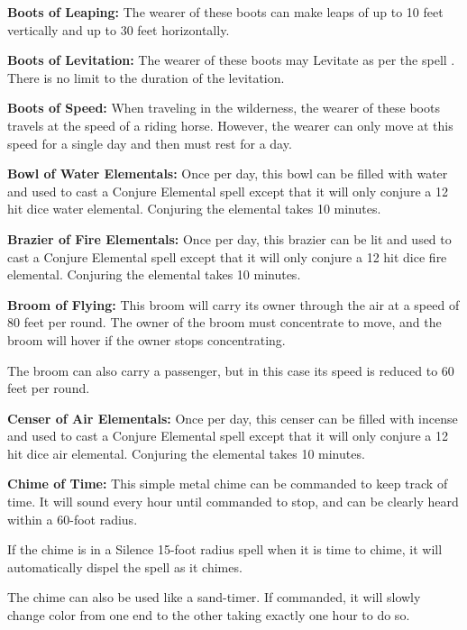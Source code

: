 \begin{multicols*}{2}
\textbf{Boots of Leaping:} The wearer of these boots can make leaps of up to 10 feet vertically and up to 30 feet horizontally.

\textbf{Boots of Levitation:} The wearer of these boots may Levitate as per the spell . There is no limit to the duration of the levitation.

\textbf{Boots of Speed:} When traveling in the wilderness, the wearer of these boots travels at the speed of a riding horse. However, the wearer can only move at this speed for a single day and then must rest for a day.

\textbf{Bowl of Water Elementals:} Once per day, this bowl can be filled with water and used to cast a Conjure Elemental spell except that it will only conjure a 12 hit dice water elemental. Conjuring the elemental takes 10 minutes.

\textbf{Brazier of Fire Elementals:} Once per day, this brazier can be lit and used to cast a Conjure Elemental spell except that it will only conjure a 12 hit dice fire elemental. Conjuring the elemental takes 10 minutes.

\textbf{Broom of Flying:}\label{mitem:Broom of Flying} This broom will carry its owner through the air at a speed of 80 feet per round. The owner of the broom must concentrate to move, and the broom will hover if the owner stops concentrating.

The broom can also carry a passenger, but in this case its speed is reduced to 60 feet per round.

\textbf{Censer of Air Elementals:} Once per day, this censer can be filled with incense and used to cast a Conjure Elemental spell except that it will only conjure a 12 hit dice air elemental. Conjuring the elemental takes 10 minutes.

\textbf{Chime of Time:} This simple metal chime can be commanded to keep track of time. It will sound every hour until commanded to stop, and can be clearly heard within a 60-foot radius.

If the chime is in a Silence 15-foot radius spell when it is time to chime, it will automatically dispel the spell as it chimes.

The chime can also be used like a sand-timer. If commanded, it will slowly change color from one end to the other taking exactly one hour to do so.


\end{multicols*}
